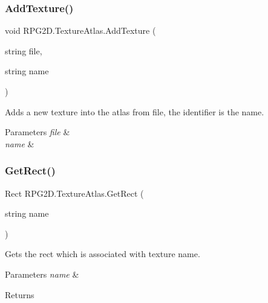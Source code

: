 \subsubsection{\texorpdfstring{Add\+Texture()}{AddTexture()}\hspace{0.1cm}{\footnotesize\ttfamily [2/2]}}
{\footnotesize\ttfamily void R\+P\+G2\+D.\+Texture\+Atlas.\+Add\+Texture (\begin{DoxyParamCaption}\item[{string}]{file,  }\item[{string}]{name }\end{DoxyParamCaption})\hspace{0.3cm}{\ttfamily [inline]}}



Adds a new texture into the atlas from file, the identifier is the name. 


\begin{DoxyParams}{Parameters}
{\em file} & \\
\hline
{\em name} & \\
\hline
\end{DoxyParams}
\mbox{\label{class_r_p_g2_d_1_1_texture_atlas_a3885f49ace63b00ebcbcfe6a63ca114c}} 
\subsubsection{\texorpdfstring{Get\+Rect()}{GetRect()}}
{\footnotesize\ttfamily Rect R\+P\+G2\+D.\+Texture\+Atlas.\+Get\+Rect (\begin{DoxyParamCaption}\item[{string}]{name }\end{DoxyParamCaption})\hspace{0.3cm}{\ttfamily [inline]}}



Gets the rect which is associated with texture name. 


\begin{DoxyParams}{Parameters}
{\em name} & \\
\hline
\end{DoxyParams}
\begin{DoxyReturn}{Returns}

\end{DoxyReturn}
\mbox{\label{class_r_p_g2_d_1_1_texture_atlas_a1ca0eef601c357e75ffd2e7b7e9348d3}} 
